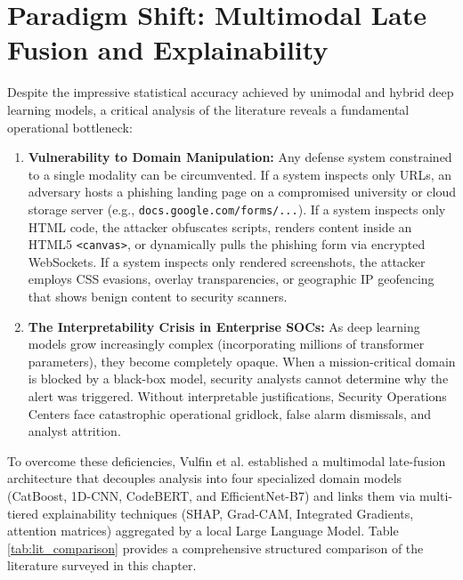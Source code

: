 \section{Paradigm Shift: Multimodal Late Fusion and Explainability}
Despite the impressive statistical accuracy achieved by unimodal and hybrid deep learning models, a critical analysis of the literature reveals a fundamental operational bottleneck:
\begin{enumerate}
\item \textbf{Vulnerability to Domain Manipulation:} Any defense system constrained to a single modality can be circumvented. If a system inspects only URLs, an adversary hosts a phishing landing page on a compromised university or cloud storage server (e.g., \texttt{docs.google.com/forms/...}). If a system inspects only HTML code, the attacker obfuscates scripts, renders content inside an HTML5 \texttt{<canvas>}, or dynamically pulls the phishing form via encrypted WebSockets. If a system inspects only rendered screenshots, the attacker employs CSS evasions, overlay transparencies, or geographic IP geofencing that shows benign content to security scanners.
\item \textbf{The Interpretability Crisis in Enterprise SOCs:} As deep learning models grow increasingly complex (incorporating millions of transformer parameters), they become completely opaque. When a mission-critical domain is blocked by a black-box model, security analysts cannot determine why the alert was triggered. Without interpretable justifications, Security Operations Centers face catastrophic operational gridlock, false alarm dismissals, and analyst attrition.
\end{enumerate}

To overcome these deficiencies, Vulfin et al. \cite{1} established a multimodal late-fusion architecture that decouples analysis into four specialized domain models (CatBoost, 1D-CNN, CodeBERT, and EfficientNet-B7) and links them via multi-tiered explainability techniques (SHAP, Grad-CAM, Integrated Gradients, attention matrices) aggregated by a local Large Language Model. Table \ref{tab:lit_comparison} provides a comprehensive structured comparison of the literature surveyed in this chapter.

